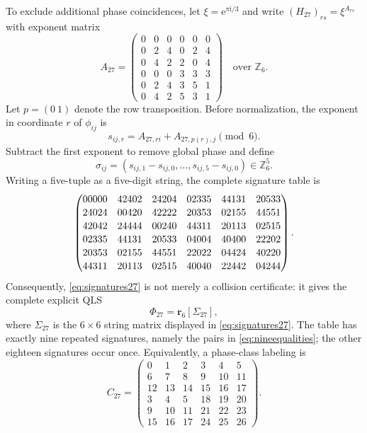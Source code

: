 \documentclass[11pt,a4paper]{article}
\newcommand{\Z}{\mathbb{Z}}
\newcommand{\ii}{\mathrm{i}}
\newcommand{\e}{\mathrm{e}}
\begin{document}
To exclude additional phase coincidences, let $\xi=\e^{\pi\ii/3}$ and write
$(H_{27})_{rs}=\xi^{A_{rs}}$ with exponent matrix
\begin{equation}\label{eq:A27}
 A_{27}=
 \begin{pmatrix}
 0&0&0&0&0&0\\
 0&2&4&0&2&4\\
 0&4&2&2&0&4\\
 0&0&0&3&3&3\\
 0&2&4&3&5&1\\
 0&4&2&5&3&1
 \end{pmatrix}
 \quad\text{over }\Z_6.
\end{equation}
Let $p=(0\ 1)$ denote the row transposition.  Before normalization, the
exponent in coordinate $r$ of $\phi_{ij}$ is
\[
 s_{ij,r}=A_{27,ri}+A_{27,p(r),j}\pmod6.
\]
Subtract the first exponent to remove global phase and define
\[
 \sigma_{ij}=
 (s_{ij,1}-s_{ij,0},\ldots,s_{ij,5}-s_{ij,0})\in\Z_6^5.
\]
Writing a five-tuple as a five-digit string, the complete signature table is
\begin{equation}\label{eq:signatures27}
\renewcommand{\arraystretch}{1.12}
 \begin{pmatrix}
 00000&42402&24204&02335&44131&20533\\
 24024&00420&42222&20353&02155&44551\\
 42042&24444&00240&44311&20113&02515\\
 02335&44131&20533&04004&40400&22202\\
 20353&02155&44551&22022&04424&40220\\
 44311&20113&02515&40040&22442&04244
 \end{pmatrix}.
\end{equation}
Consequently, \eqref{eq:signatures27} is not merely a collision certificate:
it gives the complete explicit QLS
\begin{equation}\label{eq:explicit27}
 \Phi_{27}=\mathbf r_6\!\left[\Sigma_{27}\right],
\end{equation}
where $\Sigma_{27}$ is the $6\times6$ string matrix displayed in
\eqref{eq:signatures27}.  The table has exactly nine repeated signatures,
namely the pairs in
\eqref{eq:nineequalities}; the other eighteen signatures occur once.
Equivalently, a phase-class labeling is
\begin{equation}\label{eq:class27}
 C_{27}=
 \begin{pmatrix}
 0&1&2&3&4&5\\
 6&7&8&9&10&11\\
 12&13&14&15&16&17\\
 3&4&5&18&19&20\\
 9&10&11&21&22&23\\
 15&16&17&24&25&26
 \end{pmatrix}.
\end{equation}
\end{document}

